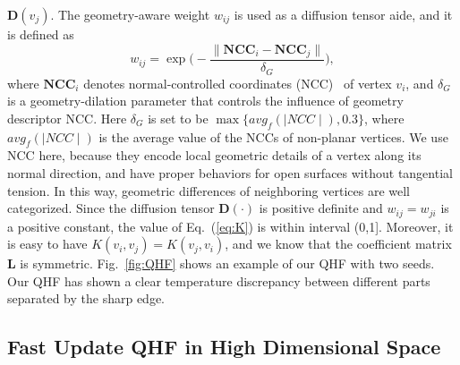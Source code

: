 \documentclass[10pt,journal,cspaper,compsoc]{IEEEtran}
\begin{document}
$\textbf{D}(v_j)$. The geometry-aware weight $w_{ij}$ is used as a
diffusion tensor aide, and it is defined as
\begin{equation}\label{eq:weight}
w_{ij}=\exp\Big(-\frac{\|\textbf{NCC}_i-\textbf{NCC}_j\|}{\delta_{G}}\Big),
\end{equation}
where $\textbf{NCC}_i$ denotes normal-controlled coordinates
(NCC)~\cite{WHSQ11_a} of vertex $v_i$, and $\delta_{G}$ is a
geometry-dilation parameter that controls the influence of geometry
descriptor NCC. Here $\delta_{G}$ is set to be $\max \{avg_f(\mid
NCC\mid), 0.3\}$, where $avg_f(\mid NCC\mid)$ is the average value of
the NCCs of non-planar vertices. We use NCC here, because they encode
local geometric details of a vertex along its normal direction, and
have proper behaviors for open surfaces without tangential tension. In
this way, geometric differences of neighboring vertices are well
categorized. Since the diffusion tensor $\textbf{D}(\cdot)$ is
positive definite and $w_{ij}=w_{ji}$ is a positive constant, the
value of Eq.~(\ref{eq:K}) is within interval (0,1]. Moreover, it is
easy to have $K(v_i,v_j)=K(v_j,v_i)$, and we know that the coefficient
matrix $\textbf{L}$ is symmetric. Fig.~\ref{fig:QHF} shows an example
of our QHF with two seeds. Our QHF has shown a clear temperature
discrepancy between different parts separated by the sharp edge.

\subsection{Fast Update QHF in High Dimensional Space}
\end{document}
